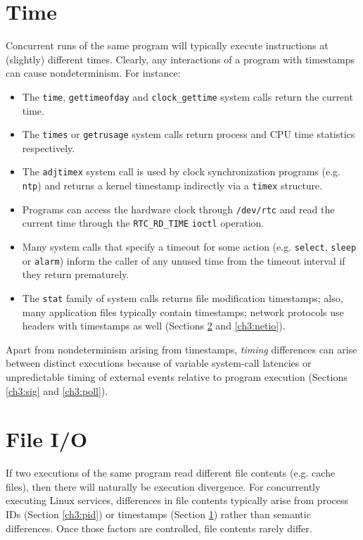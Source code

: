 \section{Time} \label{ch3:time}
Concurrent runs of the same program will typically
execute instructions at (slightly) different times.
Clearly, any interactions of a program with timestamps
can cause nondeterminism. For instance:

\begin{itemize}
\item The \texttt{time}, \texttt{gettimeofday} and \texttt{clock\_gettime}
 system calls return the current time.
\item The \texttt{times} or \texttt{getrusage} system calls
return process and CPU time statistics respectively.
\item The \texttt{adjtimex} system call is used 
by clock synchronization programs (e.g. \texttt{ntp}) 
and returns a kernel timestamp indirectly via 
a \texttt{timex} structure.
\item Programs can access the hardware clock
through \texttt{/dev/rtc} and read the current time
through the \texttt{RTC\_RD\_TIME} \texttt{ioctl}
operation.
\item Many system calls that specify a timeout
for some action (e.g. \texttt{select}, \texttt{sleep} or \texttt{alarm})
inform the caller of any unused time from the timeout interval if they
return prematurely.
\item The \texttt{stat} family of system calls returns file
  modification timestamps; also, many application files typically contain timestamps;
  network protocols use headers with timestamps as well (Sections \ref{ch3:fileio}
  and \ref{ch3:netio}).
\end{itemize}

Apart from nondeterminism arising
from timestamps, {\em timing} differences
can arise between distinct executions 
because of variable system-call latencies 
or unpredictable timing of
external events relative
to program execution (Sections \ref{ch3:sig} and \ref{ch3:poll}).

\section{File I/O} \label{ch3:fileio}
 \newline
If two executions of the same program read different
file contents (e.g. cache files), then
there will naturally be execution divergence.
For concurrently executing Linux services,
differences in file contents typically arise
from process IDs (Section \ref{ch3:pid}) or timestamps (Section \ref{ch3:time})
rather than semantic differences.
Once those factors are controlled, file contents rarely differ. \newline

